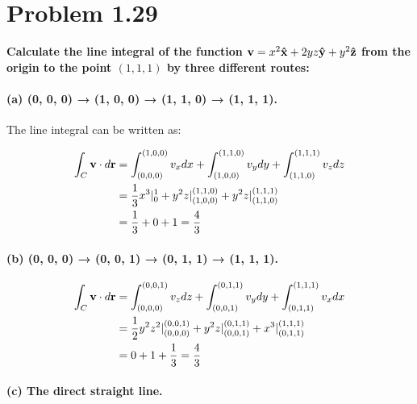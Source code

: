 \documentclass{article}
\numberwithin{equation}{section}
\newcommand{\vbh}[1]{\vb{\hat{#1}}}
\begin{document}
\section{Problem 1.29}

\textbf{Calculate the line integral of the function $\vb{v} = x^2 \vbh{x} + 2yz \vbh{y} + y^2 \vbh{z}$ from the origin to the point $(1,1,1)$ by three different routes:}
\paragraph{(a) (0, 0, 0) → (1, 0, 0) → (1, 1, 0) → (1, 1, 1).\\}

The line integral can be written as:

\begin{equation}
\begin{split}
    \int_{C} \vb{v} \cdot d \vb{r} &= \int_{(0,0,0)}^{(1,0,0)} v_x dx + \int_{(1,0,0)}^{(1,1,0)} v_y dy + \int_{(1,1,0)}^{(1,1,1)} v_z dz \\
    &= \frac{1}{3} x^3 \rvert^{1}_{0} + y^2z \rvert^{(1,1,0)}_{(1,0,0)} + y^2z \rvert^{(1,1,1)}_{(1,1,0)} \\ 
    &= \frac{1}{3} + 0 + 1 = \frac{4}{3}
    \end{split}
\end{equation}

\paragraph{(b) (0, 0, 0) → (0, 0, 1) → (0, 1, 1) → (1, 1, 1).\\}

\begin{equation}
\begin{split}
    \int_{C} \vb{v} \cdot d \vb{r} &= \int_{(0,0,0)}^{(0,0,1)} v_z dz + \int_{(0,0,1)}^{(0,1,1)} v_y dy + \int_{(0,1,1)}^{(1,1,1)} v_x dx \\
    &= \frac{1}{2} y^2 z^2 \rvert^{(0,0,1)}_{(0,0,0)} + y^2z \rvert^{(0,1,1)}_{(0,0,1)} + x^3 \rvert^{(1,1,1)}_{(0,1,1)} \\ 
    &= 0+ 1 + \frac{1}{3} = \frac{4}{3}
    \end{split}
\end{equation}

\paragraph{(c) The direct straight line.\\}
\end{document}

